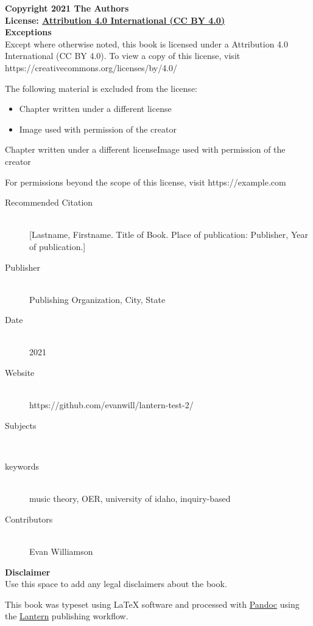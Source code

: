 \documentclass{book}
\newcommand{\booklicense}{\href{https://creativecommons.org/licenses/by/4.0/}{Attribution
4.0 International (CC BY 4.0)}}
\begin{document}
\begin{flushleft}

\textbf{Copyright \textcopyright{} 2021  The Authors\\
License: \booklicense}\\[11pt] 

\textbf{Exceptions} \\

Except where otherwise noted, this book is licensed under a Attribution 4.0
International (CC BY
4.0). To view a copy of this license, visit https://creativecommons.org/licenses/by/4.0/

The following material is excluded from the license: 

\begin{itemize}
    \item Chapter written under a different license
    \item Image used with permission of the creator
  \end{itemize}

Chapter written under a different licenseImage used with permission of the
creator

For permissions beyond the scope of this license, visit https://example.com

\vspace*{\fill}

\begin{description}
  \item[Recommended Citation] \hfill \\ {[}Lastname, Firstname. Title of Book.
Place of publication: Publisher, Year of publication.{]}
  \item[Publisher] \hfill \\ Publishing Organization, City, State
  \item[Date] \hfill \\ 2021
    \item[Website] \hfill \\ https://github.com/evanwill/lantern-test-2/
          \item[Subjects] \hfill \\ 
  \item[keywords] \hfill \\ music theory, OER, university of
idaho, inquiry-based
    \item[Contributors] \hfill \\ Evan Williamson
  
\end{description}

\textbf{Disclaimer} \\
  Use this space to add any legal disclaimers about the book.

\vspace*{\fill}

This book was typeset using \LaTeX{} software and processed with \href{https://pandoc.org}{Pandoc} using the \href{http://lantern.northwestern.pub}{Lantern} publishing workflow.\\

\end{flushleft}
\end{document}
